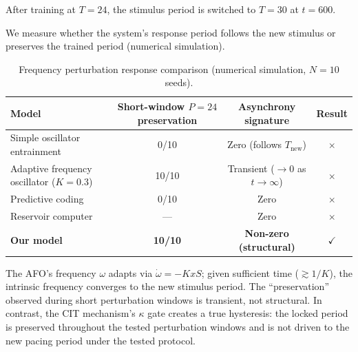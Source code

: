 \documentclass[12pt,a4paper]{article}
\begin{document}
After training at $T=24$, the stimulus period is switched to $T=30$ at $t=600$.

We measure whether the system's response period follows the new stimulus or preserves the trained period (numerical simulation).



\begin{table}[h]

\centering

\caption{Frequency perturbation response comparison (numerical simulation, $N=10$ seeds).}

\begin{tabular}{lccc}

\toprule

Model & Short-window $P=24$ preservation & Asynchrony signature & Result \\

\midrule

Simple oscillator entrainment & 0/10 & Zero (follows $T_{\mathrm{new}}$) & $\times$ \\

Adaptive frequency oscillator ($K=0.3$) & 10/10 & Transient ($\rightarrow 0$ as $t\rightarrow\infty$) & $\times$ \\

Predictive coding & 0/10 & Zero & $\times$ \\

Reservoir computer & — & Zero & $\times$ \\

\textbf{Our model} & \textbf{10/10} & \textbf{Non-zero (structural)} & $\checkmark$ \\

\bottomrule

\end{tabular}

\label{tab:freq_sim}

\end{table}



The AFO's frequency $\omega$ adapts via $\dot{\omega} = -KxS$; given sufficient time ($\gtrsim 1/K$), the intrinsic frequency converges to the new stimulus period. The ``preservation'' observed during short perturbation windows is transient, not structural. In contrast, the CIT mechanism's $\kappa$ gate creates a true hysteresis: the locked period is preserved throughout the tested perturbation windows and is not driven to the new pacing period under the tested protocol.
\end{document}
